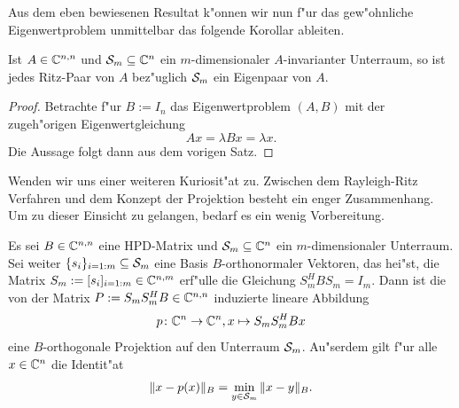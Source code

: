 Aus dem eben bewiesenen Resultat k"onnen wir nun f"ur das gew"ohnliche Eigenwertproblem unmittelbar das folgende Korollar
ableiten.

\begin{kor}
Ist $A\in\Cnn$ und $\S_m\subseteq \Cn$ ein $m$-dimensionaler $A$-invarianter Unterraum, so ist
jedes Ritz-Paar von $A$ bez"uglich $\S_m$ ein Eigenpaar von $A$.
\end{kor}

\begin{proof}
Betrachte f"ur $B:=I_n$ das Eigenwertproblem $(A,B)$
mit der zugeh"origen Eigenwertgleichung
\[
Ax = \lambda Bx = \lambda x.
\]
Die Aussage folgt dann aus dem vorigen Satz.
\end{proof}

Wenden wir uns einer weiteren Kuriosit"at zu. Zwischen dem Rayleigh-Ritz Verfahren und dem Konzept der Projektion besteht ein enger Zusammenhang.
Um zu dieser Einsicht zu gelangen, bedarf es ein wenig
Vorbereitung.
\begin{thm}\label{thm:chap3:projektor}
Es sei $B\in\Cnn$ eine HPD-Matrix und $\S_m \subseteq \Cn$ ein $m$-dimensionaler Unterraum. Sei weiter $\{s_i\}_{i=1:m}\subseteq\S_m$ eine
Basis $B$-orthonormaler Vektoren, das hei"st, die Matrix $S_m := [s_i]_{i=1:m}
\in\C^{n,m}$ erf"ulle die Gleichung $S_m^H B S_m = I_m$. Dann ist die von der Matrix
 $P := S_m S_m^H B \in \Cnn$ induzierte lineare Abbildung
\[
p \colon \Cn \to \Cn, x\mapsto S_m S_m^H Bx
\]
eine $B$-orthogonale Projektion auf den Unterraum $\S_m$. Au"serdem gilt
f"ur alle $x\in\Cn$ die Identit"at
\[
\|x-p(x)\|_B = \min_{y\in\S_m} \|x - y\|_B.
\]
\end{thm}

